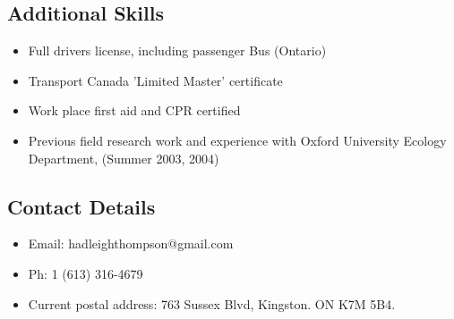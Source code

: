 \documentclass[]{article}
\begin{document}
\subsection*{Additional Skills}
\begin{itemize}
\item Full drivers license, including passenger Bus (Ontario)
\item Transport Canada 'Limited Master' certificate
\item Work place first aid and CPR certified
\item Previous field research work and experience with Oxford University Ecology Department, (Summer 2003, 2004)
\end{itemize}

\subsection*{Contact Details}
\begin{itemize}
\item Email: hadleighthompson@gmail.com
\item Ph: 1 (613) 316-4679
\item Current postal address: 763 Sussex Blvd, Kingston. ON K7M 5B4.
\end{itemize}
\end{document}
